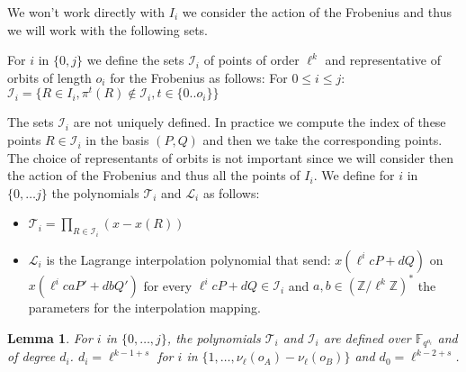 \documentclass{lms}
\newtheorem{lem}[thm]{Lemma}
\begin{document}
We won't work directly with $I_i$ we consider the action of the Frobenius and thus we will work with the following sets.
\newline
\begin{defi}
For $i$ in $\{0,j\}$ we define the sets
$\mathcal{I}_i$ of points of order $\ell^k$ and representative of orbits of length $o_i$ for the Frobenius as follows:
\newline
For $0 \leqslant i \leqslant j $:
$\mathcal{I}_i=\{ R \in I_i, \pi^t(R) \notin \mathcal{I}_i, t \in \{0.. o_i\} \} $ 
\end{defi}
The sets $\mathcal{I}_i$ are not uniquely defined. In practice we compute the index of these points $R \in \mathcal{I}_i$ in the basis $(P,Q)$ and then we take the corresponding points. The choice of representants of orbits is not important since we will consider then the action of the Frobenius and thus all the points of $I_i$.
\newline
We define for $i$ in $\{0,\dots j\}$ the polynomials
$\mathcal{T}_i$ and $\mathcal{L}_i$ as follows:
\begin{itemize}
\item $\mathcal{T}_i= \prod_{R \in \mathcal{I}_i} (x-x(R))$
\item $\mathcal{L}_i$ is the Lagrange interpolation polynomial that send: $x(\ell^i c P + d Q)$ on $x(\ell^i c aP' + d b Q')$ for every  $ \ell^i c P + d Q  \in \mathcal{I}_i$ and $a,b \in \left( \mathbb{Z}/ \ell^k \mathbb{Z} \right)^{*}$ the parameters for the interpolation mapping.
\end{itemize}


\begin{lem}
  For $i$ in $\{0, \dots,j\}$, the
  polynomials $\mathcal{T}_i$ and $\mathcal{I}_i$ are defined over
  $\mathbb{F}_{q^{o_i}}$ and of degree $d_i$. $d_i=\ell^{k-1+s}$ for $i$ in $\{1, \dots,\nu_{\ell}(o_A)-\nu_{\ell}(o_B)\}$ and $d_0=\ell^{k-2+s}$.
\end{lem}
\end{document}
